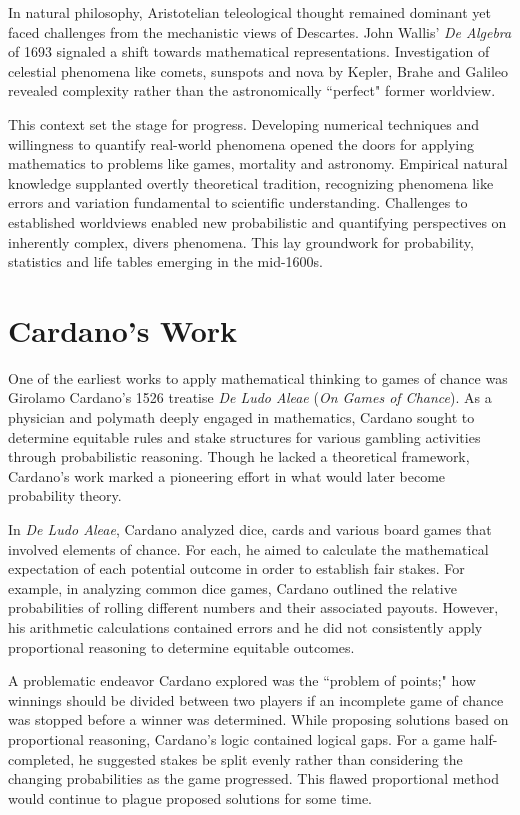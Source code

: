 In natural philosophy, Aristotelian teleological thought remained dominant yet faced challenges from the mechanistic views of Descartes. John Wallis' \emph{De Algebra} of 1693 signaled a shift towards mathematical representations. Investigation of celestial phenomena like comets, sunspots and nova by Kepler, Brahe and Galileo revealed complexity rather than the astronomically ``perfect" former worldview.

This context set the stage for progress. Developing numerical techniques and willingness to quantify real-world phenomena opened the doors for applying mathematics to problems like games, mortality and astronomy. Empirical natural knowledge supplanted overtly theoretical tradition, recognizing phenomena like errors and variation fundamental to scientific understanding. Challenges to established worldviews enabled new probabilistic and quantifying perspectives on inherently complex, divers phenomena. This lay groundwork for probability, statistics and life tables emerging in the mid-1600s.

\section{Cardano's Work}

One of the earliest works to apply mathematical thinking to games of chance was Girolamo Cardano's 1526 treatise \emph{De Ludo Aleae} (\emph{On Games of Chance}). As a physician and polymath deeply engaged in mathematics, Cardano sought to determine equitable rules and stake structures for various gambling activities through probabilistic reasoning. Though he lacked a theoretical framework, Cardano's work marked a pioneering effort in what would later become probability theory.

In \emph{De Ludo Aleae}, Cardano analyzed dice, cards and various board games that involved elements of chance. For each, he aimed to calculate the mathematical expectation of each potential outcome in order to establish fair stakes. For example, in analyzing common dice games, Cardano outlined the relative probabilities of rolling different numbers and their associated payouts. However, his arithmetic calculations contained errors and he did not consistently apply proportional reasoning to determine equitable outcomes.

A problematic endeavor Cardano explored was the ``problem of points;" how winnings should be divided between two players if an incomplete game of chance was stopped before a winner was determined. While proposing solutions based on proportional reasoning, Cardano's logic contained logical gaps. For a game half-completed, he suggested stakes be split evenly rather than considering the changing probabilities as the game progressed. This flawed proportional method would continue to plague proposed solutions for some time.

